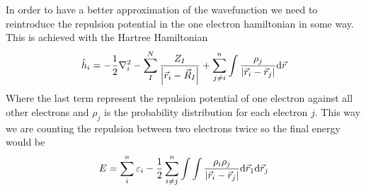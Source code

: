 \documentclass[../master_thesis.tex]{subfiles}
\begin{document}
In order to have a better approximation of the wavefunction we need to reintroduce
the repulsion potential in the one electron hamiltonian in some way. This is achieved with
the Hartree Hamiltonian\cite{Cramer:2004}
\begin{equation}\label{eq:hartreeham}
  \hat{h}_i = -\frac{1}{2}\nabla^2_i - \sum^N_I\frac{Z_I}{\abs{\vec{r}_i - \vec{R}_I}} + \sum_{j\neq i}^n\int \frac{\rho_j}{\abs{\vec{r}_i - \vec{r}_j}}\text{d}\vec{r}
\end{equation}
Where the last term represent the repulsion potential of one electron against
all other electrons and $\rho_j$ is the probability distribution for each electron
$j$. This way we are counting the repulsion between two electrons twice so the
final energy would be
\begin{equation}
  E = \sum_i^n\varepsilon_i - \frac{1}{2}\sum_{i\neq j}^n\int\int\frac{\rho_i\rho_j}{\abs{\vec{r}_i - \vec{r}_j}}\text{d}\vec{r}_1\text{d}\vec{r}_j
\end{equation}
\end{document}
